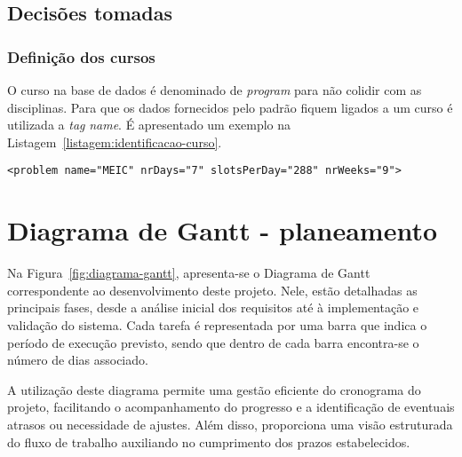 \subsection{Decisões tomadas}

\subsubsection{Definição dos cursos}

O curso na base de dados é denominado de \textit{program} para não colidir com as disciplinas. Para que os dados fornecidos pelo padrão fiquem ligados a um curso é utilizada a \textit{tag} \textit{name}. É apresentado um exemplo na Listagem~\ref{listagem:identificacao-curso}.

\begin{minipage}[c]{\linewidth}
\begin{lstlisting}[caption={Exemplo da identificação do curso.}, label={listagem:identificacao-curso}]
<problem name="MEIC" nrDays="7" slotsPerDay="288" nrWeeks="9">
\end{lstlisting}
\end{minipage}

\section{Diagrama de Gantt - planeamento}
\label{capitulo3:Diagrama-gantt}

Na Figura~\ref{fig:diagrama-gantt}, apresenta-se o Diagrama de Gantt correspondente ao desenvolvimento deste projeto. Nele, estão detalhadas as principais fases, desde a análise inicial dos requisitos até à implementação e validação do sistema. Cada tarefa é representada por uma barra que indica o período de execução previsto, sendo que dentro de cada barra encontra-se o número de dias associado.

A utilização deste diagrama permite uma gestão eficiente do cronograma do projeto, facilitando o acompanhamento do progresso e a identificação de eventuais atrasos ou necessidade de ajustes. Além disso, proporciona uma visão estruturada do fluxo de trabalho auxiliando no cumprimento dos prazos estabelecidos.

